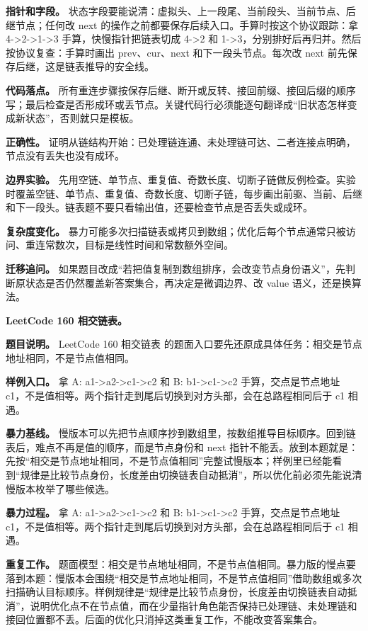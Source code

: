\textbf{指针和字段。} 状态字段要能说清：虚拟头、上一段尾、当前段头、当前节点、后继节点；任何改 next 的操作之前都要保存后续入口。手算时按这个协议跟踪：拿 4->2->1->3 手算，快慢指针把链表切成 4->2 和 1->3，分别排好后再归并。然后按协议复查：手算时画出 prev、cur、next 和下一段头节点。每次改 next 前先保存后继，这是链表推导的安全线。

\textbf{代码落点。} 所有重连步骤按保存后继、断开或反转、接回前缀、接回后缀的顺序写；最后检查是否形成环或丢节点。关键代码行必须能逐句翻译成“旧状态怎样变成新状态”，否则就只是模板。

\textbf{正确性。} 证明从链结构开始：已处理链连通、未处理链可达、二者连接点明确，节点没有丢失也没有成环。

\textbf{边界实验。} 先用空链、单节点、重复值、奇数长度、切断子链做反例检查。实验时覆盖空链、单节点、重复值、奇数长度、切断子链，每步画出前驱、当前、后继和下一段头。链表题不要只看输出值，还要检查节点是否丢失或成环。

\textbf{复杂度变化。} 暴力可能多次扫描链表或拷贝到数组；优化后每个节点通常只被访问、重连常数次，目标是线性时间和常数额外空间。

\textbf{迁移追问。} 如果题目改成“若把值复制到数组排序，会改变节点身份语义”，先判断原状态是否仍然覆盖新答案集合，再决定是微调边界、改 value 语义，还是换算法。

\noindent\textbf{LeetCode 160 相交链表。}

\textbf{题目说明。} LeetCode 160 相交链表 的题面入口要先还原成具体任务：相交是节点地址相同，不是节点值相同。

\textbf{样例入口。} 拿 A: a1->a2->c1->c2 和 B: b1->c1->c2 手算，交点是节点地址 c1，不是值相等。两个指针走到尾后切换到对方头部，会在总路程相同后于 c1 相遇。

\textbf{暴力基线。} 慢版本可以先把节点顺序抄到数组里，按数组推导目标顺序。回到链表后，难点不再是值的顺序，而是节点身份和 next 指针不能丢。放到本题就是：先按“相交是节点地址相同，不是节点值相同”完整试慢版本；样例里已经能看到“规律是比较节点身份，长度差由切换链表自动抵消”，所以优化前必须先能说清慢版本枚举了哪些候选。

\textbf{暴力过程。} 拿 A: a1->a2->c1->c2 和 B: b1->c1->c2 手算，交点是节点地址 c1，不是值相等。两个指针走到尾后切换到对方头部，会在总路程相同后于 c1 相遇。

\textbf{重复工作。} 题面模型：相交是节点地址相同，不是节点值相同。暴力版的慢点要落到本题：慢版本会围绕“相交是节点地址相同，不是节点值相同”借助数组或多次扫描确认目标顺序。样例规律是“规律是比较节点身份，长度差由切换链表自动抵消”，说明优化点不在节点值，而在少量指针角色能否保持已处理链、未处理链和接回位置都不丢。后面的优化只消掉这类重复工作，不能改变答案集合。

